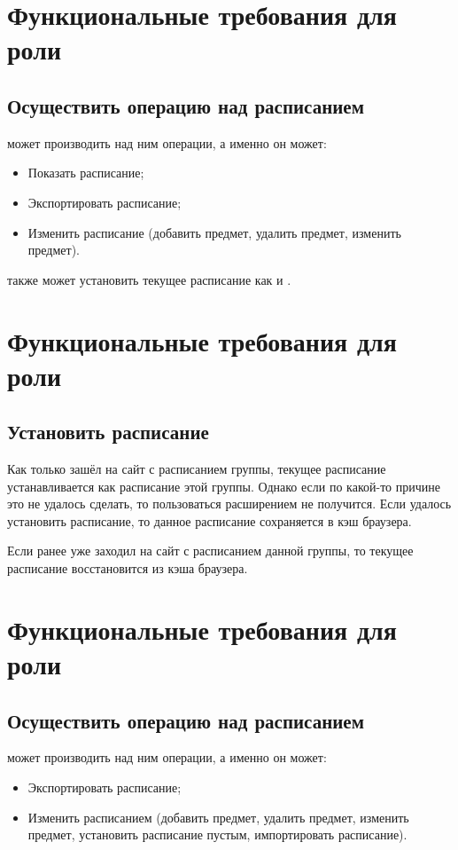 	\section{Функциональные требования для роли }
		\subsection{Осуществить операцию над расписанием}
			 может производить над ним операции, а именно он может:
			\begin{itemize}
				\item Показать расписание;
				
				\item Экспортировать расписание;
				
				\item Изменить расписание (добавить предмет, удалить предмет, изменить предмет).
			\end{itemize}
			
			 также может установить текущее расписание как и .
	\section{Функциональные требования для роли }
		\subsection{Установить расписание}
			Как только  зашёл на сайт с расписанием группы, текущее расписание устанавливается как расписание этой группы. Однако если по какой-то причине это не удалось сделать, то пользоваться расширением не получится. Если удалось установить расписание, то данное расписание сохраняется в кэш браузера.
			
			Если  ранее уже заходил на сайт с расписанием данной группы, то текущее расписание восстановится из кэша браузера.
	\section{Функциональные требования для роли }
		\subsection{Осуществить операцию над расписанием}
			 может производить над ним операции, а именно он может:
			\begin{itemize}
				\item Экспортировать расписание;
					
				\item Изменить расписанием (добавить предмет, удалить предмет, изменить предмет, установить расписание пустым, импортировать расписание).
			\end{itemize}
			
